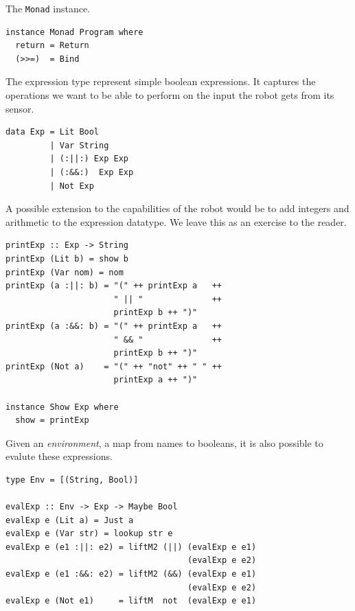 The \verb!Monad! instance. 

\begin{small}
\begin{verbatim} 
instance Monad Program where
  return = Return
  (>>=)  = Bind
\end{verbatim}
\end{small}

The expression type represent simple boolean expressions. It captures the 
operations we want to be able to perform on the input the robot gets from its 
sensor. 

\begin{small}
\begin{verbatim}
data Exp = Lit Bool
         | Var String
         | (:||:) Exp Exp
         | (:&&:)  Exp Exp
         | Not Exp  
\end{verbatim}
\end{small}

A possible extension to the capabilities of the robot would be to add integers
and arithmetic to the expression datatype. We leave this as an exercise to the 
reader. 

\begin{small}
\begin{verbatim} 
printExp :: Exp -> String
printExp (Lit b) = show b
printExp (Var nom) = nom
printExp (a :||: b) = "(" ++ printExp a   ++ 
                      " || "              ++ 
                      printExp b ++ ")"
printExp (a :&&: b) = "(" ++ printExp a   ++ 
                      " && "              ++ 
                      printExp b ++ ")"
printExp (Not a)    = "(" ++ "not" ++ " " ++ 
                      printExp a ++ ")"

instance Show Exp where
  show = printExp 
\end{verbatim} 
\end{small}

Given an {\em environment}, a map from names to booleans, it is also possible 
to evalute these expressions. 

\begin{small}
\begin{verbatim}
type Env = [(String, Bool)]

evalExp :: Env -> Exp -> Maybe Bool
evalExp e (Lit a) = Just a
evalExp e (Var str) = lookup str e
evalExp e (e1 :||: e2) = liftM2 (||) (evalExp e e1) 
                                     (evalExp e e2)
evalExp e (e1 :&&: e2) = liftM2 (&&) (evalExp e e1) 
                                     (evalExp e e2)
evalExp e (Not e1)     = liftM  not  (evalExp e e1)
\end{verbatim} 
\end{small}


